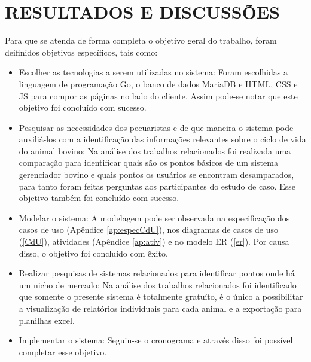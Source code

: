 %
%


\chapter{\textbf{RESULTADOS E DISCUSSÕES}}\label{chap:resultados}

Para que se atenda de forma completa o objetivo geral do trabalho, foram deifinidos objetivos específicos, tais como:
\begin{itemize}
	\item Escolher as tecnologias a serem utilizadas no sistema:
	\newline
	Foram escolhidas a linguagem de programação Go, o banco de dados MariaDB e HTML, CSS e JS para compor as páginas no lado do cliente. Assim pode-se notar que este objetivo foi concluído com sucesso.

	\item Pesquisar as necessidades dos pecuaristas e de que maneira o sistema pode auxiliá-los com a identificação das informações relevantes sobre o ciclo de vida do animal bovino:
	\newline
	Na análise dos trabalhos relacionados foi realizada uma comparação para identificar quais são os pontos básicos de um sistema gerenciador bovino e quais pontos os usuários se encontram desamparados, para tanto foram feitas perguntas aos participantes do estudo de caso. Esse objetivo também foi concluído com sucesso.

	\item Modelar o sistema:
	\newline
	A modelagem pode ser observada na especificação dos casos de uso (Apêndice \ref{ap:especCdU}),  nos diagramas de casos de uso (\ref{CdU}), atividades (Apêndice \ref{ap:ativ}) e no modelo ER (\ref{er}). Por causa disso, o objetivo foi concluído com êxito.


	\item Realizar pesquisas de sistemas relacionados para identificar pontos onde há um nicho de mercado:
	\newline
	Na análise dos trabalhos relacionados foi identificado que somente o presente sistema é totalmente gratuíto, é o único a possibilitar a visualização de relatórios individuais para cada animal e a exportação para planilhas excel.

	\item Implementar o sistema:
	\newline
	Seguiu-se o cronograma e através disso foi possível completar esse objetivo.


\end{itemize}
